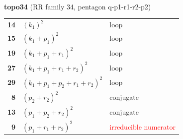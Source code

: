 \documentclass[10pt]{article}
\begin{document}
\begin{minipage}[t]{0.48\textwidth}
{}\\[2mm]\textbf{topo34} (RR family 34, pentagon q-p1-r1-r2-p2)\\[2pt]{\footnotesize\begin{tabular}{@{}r@{\ \ }l@{\ \ }l@{}}\textbf{14} & $(k_1)^2$ & loop\\
\textbf{15} & $(k_1+p_1)^2$ & loop\\
\textbf{19} & $(k_1+p_1+r_1)^2$ & loop\\
\textbf{27} & $(k_1+p_1+r_1+r_2)^2$ & loop\\
\textbf{29} & $(k_1+p_1+p_2+r_1+r_2)^2$ & loop\\
\textbf{8} & $(p_2+r_2)^2$ & conjugate\\
\textbf{13} & $(p_1+p_2+r_2)^2$ & conjugate\\
\textbf{9} & $(p_1+r_1+r_2)^2$ & \textcolor{red}{irreducible numerator}\\\end{tabular}}\end{minipage}

\bigskip
\end{document}
